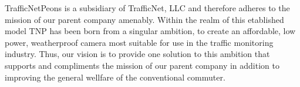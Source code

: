 TrafficNetPeons is a subsidiary of TrafficNet, LLC and therefore adheres to the mission of our parent company amenably. Within the realm of this etablished model TNP has been born from a singular ambition, to create an affordable, low power, weatherproof camera most suitable for use in the traffic monitoring industry. Thus, our vision is to provide one solution to this ambition that supports and compliments the mission of our parent company in addition to improving the general wellfare of the conventional commuter.

